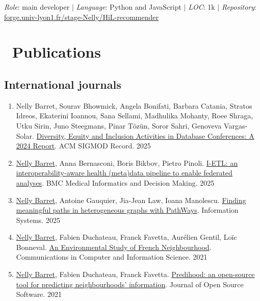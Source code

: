 \documentclass{article}
\begin{document}
\noindent\textit{Role}: main developer $|$ \textit{Language}: Python and JavaScript $|$ \textit{LOC}: 1k $|$ \textit{Repository}: \href{https://forge.univ-lyon1.fr/stage-Nelly/HiL-recommender}{forge.univ-lyon1.fr/stage-Nelly/HiL-recommender}

\section*{\faBook\ Publications}
\subsection*{International journals}
\begin{enumerate}[resume]
\item Nelly Barret, Sourav Bhowmick, Angela Bonifati, Barbara Catania, Stratos Idreos, Ekaterini Ioannou, Sana Sellami, Madhulika Mohanty, Roee Shraga, Utku Sirin, Juno Steegmans, Pinar Tözün, Soror Sahri, Genoveva Vargas-Solar. \href{https://sigmodrecord.org/publications/sigmodRecord/2509/pdfs/08_Reports_Barret.pdf}{Diversity, Equity and Inclusion Activities in Database Conferences: A 2024 Report}. ACM SIGMOD Record. 2025
\item \underline{Nelly Barret}, Anna Bernasconi, Boris Bikbov, Pietro Pinoli. \href{https://www.researchgate.net/publication/396456781_I-ETL_an_interoperability-aware_health_metadata_pipeline_to_enable_federated_analyses}{I-ETL: an interoperability-aware health (meta)data pipeline to enable federated analyses}. BMC Medical Informatics and Decision Making. 2025
\item \underline{Nelly Barret}, Antoine Gauquier, Jia-Jean Law, Ioana Manolescu. \href{https://hal.science/hal-04727209}{Finding meaningful paths in heterogeneous graphs with PathWays}. Information Systems. 2025
\item \underline{Nelly Barret}, Fabien Duchateau, Franck Favetta, Aurélien Gentil, Loïc Bonneval. \href{https://hal.science/hal-05388570}{An Environmental Study of French Neighbourhood}. Communications in Computer and Information Science. 2021
\item \underline{Nelly Barret}, Fabien Duchateau, Franck Favetta. \href{https://joss.theoj.org/papers/10.21105/joss.02805}{Predihood: an open-source tool for predicting neighbourhoods' information}. Journal of Open Source Software. 2021
\end{enumerate}
\end{document}
